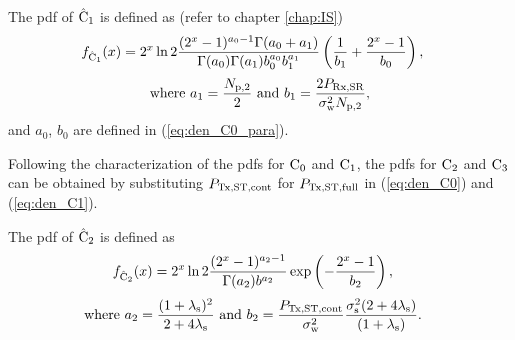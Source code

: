 \begin{lemma} \label{lm:lem4} 
\normalfont
The pdf of $\hat{\text{C}}_{\text{1}}$ is defined as (refer to chapter \ref{chap:IS})  
\begin{align}
f_{\hat{\text{C}}_{\text{1}}}(x) &= 2^x \ln 2 \frac{(2^x - 1)^{a_0 - 1} \Gamma(a_0 + a_1)}{\Gamma(a_0) \Gamma(a_1) b_0^{a_0} b_1^{a_1}} \left(\frac{1}{b_1} + \frac{2^x - 1}{b_0}\right), \label{eq:den_C1}
\end{align}
\begin{align}
\text{where  } a_1 = \frac{N_{\text{p,2}}}{2}  \text{  and  } b_1 = \frac{2 P_{\text{Rx,SR}}}{\sigma^2_{\text{w}} N_{\text{p,2}}}, \label{eq:den_C1_para} 
\end{align}
and $a_0$, $b_0$ are defined in (\ref{eq:den_C0_para}).
\end{lemma}
Following the characterization of the pdfs for $\text{C}_{\text{0}}$ and $\text{C}_{\text{1}}$, the pdfs for $\text{C}_{\text{2}}$ and $\text{C}_{\text{3}}$ can be obtained by substituting $P_{\text{Tx,ST,cont}}$ for $P_{\text{Tx,ST,full}}$ in (\ref{eq:den_C0}) and (\ref{eq:den_C1}).
\begin{lemma} \label{lm:lem5}
\normalfont
The pdf of $\hat{\text{C}}_{\text{2}}$ is defined as
\begin{align}
f_{\hat{\text{C}}_{\text{2}}}(x) &= 2^x \ln 2 \frac{(2^x - 1)^{a_2 - 1}}{\Gamma(a_2) b^{a_2}} \exp\left(-\frac{2^x - 1}{b_2}\right),  \label{eq:den_C2}
\end{align}
\begin{align}
\text{where  } a_2 = \frac{(1 + \lambda_{\text{s}})^2}{2 + 4 \lambda_{\text{s}}} &\text{ and } b_2 = \frac{P_{\text{Tx,ST,cont}}}{\sigma^2_{\text{w}}}\frac{\sigma^2_{\text{s}} (2 + 4 \lambda_{\text{s}})}{(1 + \lambda_{\text{s}})}.  \label{eq:den_C2_para} 
\end{align}
\end{lemma}


